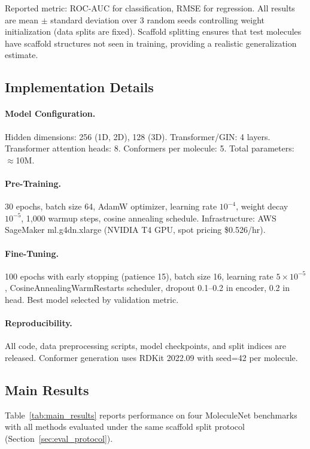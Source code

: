 \documentclass[11pt]{article}
\begin{document}
Reported metric: ROC-AUC for classification, RMSE for regression. All results are mean $\pm$ standard deviation over 3 random seeds controlling weight initialization (data splits are fixed). Scaffold splitting ensures that test molecules have scaffold structures not seen in training, providing a realistic generalization estimate.

\subsection{Implementation Details}

\paragraph{Model Configuration.}
Hidden dimensions: 256 (1D, 2D), 128 (3D). Transformer/GIN: 4 layers. Transformer attention heads: 8. Conformers per molecule: 5. Total parameters: $\approx$10M.

\paragraph{Pre-Training.}
30 epochs, batch size 64, AdamW \citep{loshchilov2019decoupled} optimizer, learning rate $10^{-4}$, weight decay $10^{-5}$, 1,000 warmup steps, cosine annealing schedule. Infrastructure: AWS SageMaker ml.g4dn.xlarge (NVIDIA T4 GPU, spot pricing \$0.526/hr).

\paragraph{Fine-Tuning.}
100 epochs with early stopping (patience 15), batch size 16, learning rate $5 \times 10^{-5}$, CosineAnnealingWarmRestarts scheduler, dropout 0.1--0.2 in encoder, 0.2 in head. Best model selected by validation metric.

\paragraph{Reproducibility.}
All code, data preprocessing scripts, model checkpoints, and split indices are released. Conformer generation uses RDKit 2022.09 with seed=42 per molecule.

\subsection{Main Results}

Table~\ref{tab:main_results} reports performance on four MoleculeNet benchmarks with all methods evaluated under the same scaffold split protocol (Section~\ref{sec:eval_protocol}).
\end{document}
